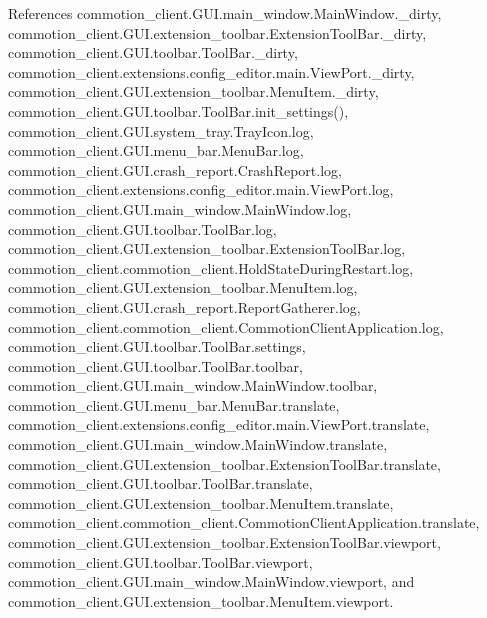 References commotion\-\_\-client.\-G\-U\-I.\-main\-\_\-window.\-Main\-Window.\-\_\-dirty, commotion\-\_\-client.\-G\-U\-I.\-extension\-\_\-toolbar.\-Extension\-Tool\-Bar.\-\_\-dirty, commotion\-\_\-client.\-G\-U\-I.\-toolbar.\-Tool\-Bar.\-\_\-dirty, commotion\-\_\-client.\-extensions.\-config\-\_\-editor.\-main.\-View\-Port.\-\_\-dirty, commotion\-\_\-client.\-G\-U\-I.\-extension\-\_\-toolbar.\-Menu\-Item.\-\_\-dirty, commotion\-\_\-client.\-G\-U\-I.\-toolbar.\-Tool\-Bar.\-init\-\_\-settings(), commotion\-\_\-client.\-G\-U\-I.\-system\-\_\-tray.\-Tray\-Icon.\-log, commotion\-\_\-client.\-G\-U\-I.\-menu\-\_\-bar.\-Menu\-Bar.\-log, commotion\-\_\-client.\-G\-U\-I.\-crash\-\_\-report.\-Crash\-Report.\-log, commotion\-\_\-client.\-extensions.\-config\-\_\-editor.\-main.\-View\-Port.\-log, commotion\-\_\-client.\-G\-U\-I.\-main\-\_\-window.\-Main\-Window.\-log, commotion\-\_\-client.\-G\-U\-I.\-toolbar.\-Tool\-Bar.\-log, commotion\-\_\-client.\-G\-U\-I.\-extension\-\_\-toolbar.\-Extension\-Tool\-Bar.\-log, commotion\-\_\-client.\-commotion\-\_\-client.\-Hold\-State\-During\-Restart.\-log, commotion\-\_\-client.\-G\-U\-I.\-extension\-\_\-toolbar.\-Menu\-Item.\-log, commotion\-\_\-client.\-G\-U\-I.\-crash\-\_\-report.\-Report\-Gatherer.\-log, commotion\-\_\-client.\-commotion\-\_\-client.\-Commotion\-Client\-Application.\-log, commotion\-\_\-client.\-G\-U\-I.\-toolbar.\-Tool\-Bar.\-settings, commotion\-\_\-client.\-G\-U\-I.\-toolbar.\-Tool\-Bar.\-toolbar, commotion\-\_\-client.\-G\-U\-I.\-main\-\_\-window.\-Main\-Window.\-toolbar, commotion\-\_\-client.\-G\-U\-I.\-menu\-\_\-bar.\-Menu\-Bar.\-translate, commotion\-\_\-client.\-extensions.\-config\-\_\-editor.\-main.\-View\-Port.\-translate, commotion\-\_\-client.\-G\-U\-I.\-main\-\_\-window.\-Main\-Window.\-translate, commotion\-\_\-client.\-G\-U\-I.\-extension\-\_\-toolbar.\-Extension\-Tool\-Bar.\-translate, commotion\-\_\-client.\-G\-U\-I.\-toolbar.\-Tool\-Bar.\-translate, commotion\-\_\-client.\-G\-U\-I.\-extension\-\_\-toolbar.\-Menu\-Item.\-translate, commotion\-\_\-client.\-commotion\-\_\-client.\-Commotion\-Client\-Application.\-translate, commotion\-\_\-client.\-G\-U\-I.\-extension\-\_\-toolbar.\-Extension\-Tool\-Bar.\-viewport, commotion\-\_\-client.\-G\-U\-I.\-toolbar.\-Tool\-Bar.\-viewport, commotion\-\_\-client.\-G\-U\-I.\-main\-\_\-window.\-Main\-Window.\-viewport, and commotion\-\_\-client.\-G\-U\-I.\-extension\-\_\-toolbar.\-Menu\-Item.\-viewport.


